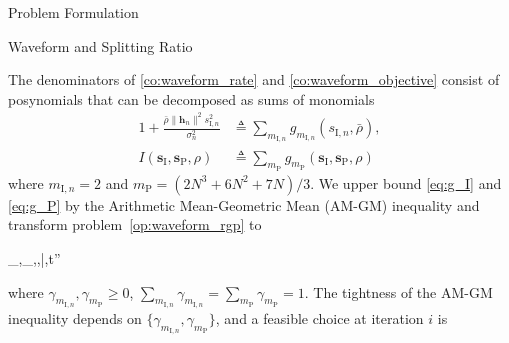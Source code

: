 \documentclass[journal]{IEEEtran}
\begin{document}
\begin{section}{Problem Formulation}
\begin{subsection}{Waveform and Splitting Ratio}
\begin{mini!}
				\label{co:waveform_objective}
				\label{co:waveform_rate}
				\label{co:waveform_power}
			\end{mini!}
			The denominators of \eqref{co:waveform_rate} and \eqref{co:waveform_objective} consist of posynomials \cite{Boyd2007} that can be decomposed as sums of monomials
			\begin{align}
				1+\frac{\bar{\rho}\lVert{\boldsymbol{h}_n}\rVert^2 s_{\mathrm{I},n}^2}{\sigma_n^2} &\triangleq \sum_{m_{\mathrm{I},n}}g_{m_{\mathrm{I},n}}(s_{\mathrm{I},n},\bar{\rho})\label{eq:g_I},\\
				I(\boldsymbol{s}_{\mathrm{I}},\boldsymbol{s}_\mathrm{P},\rho) &\triangleq \sum_{m_\mathrm{P}}{g_{m_\mathrm{P}}(\boldsymbol{s}_{\mathrm{I}},\boldsymbol{s}_\mathrm{P},\rho)}\label{eq:g_P}
			\end{align}
			where $m_{\mathrm{I},n}=2$ and $m_\mathrm{P}=(2N^3+6N^2+7N)/3$. We upper bound \eqref{eq:g_I} and \eqref{eq:g_P} by the Arithmetic Mean-Geometric Mean (AM-GM) inequality \cite{Chiang2005} and transform problem~\eqref{op:waveform_rgp} to
			\begin{mini!}
				{_{},_,\rho,\bar{\rho},t''}{}{\label{op:waveform_gp}}{}
			\end{mini!}
			where $\gamma_{m_{\mathrm{I},n}},\gamma_{m_\mathrm{P}} \ge 0$, $\sum_{m_{\mathrm{I},n}}\gamma_{m_{\mathrm{I},n}}=\sum_{m_\mathrm{P}}\gamma_{m_\mathrm{P}}=1$. The tightness of the AM-GM inequality depends on $\{\gamma_{m_{\mathrm{I},n}},\gamma_{m_\mathrm{P}}\}$, and a feasible choice at iteration $i$ is

\end{subsection}
\end{section}
\end{document}
